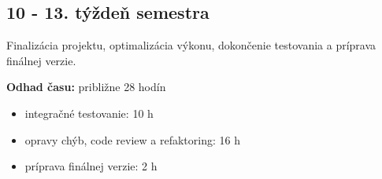 \subsection*{10 - 13. týždeň semestra}
Finalizácia projektu, optimalizácia výkonu, dokončenie testovania a príprava finálnej verzie.

\hspace{-1.5em}\textbf{Odhad času:} približne 28 hodín
\begin{itemize}[itemsep=2pt]
    \item integračné testovanie: 10 h
    \item opravy chýb, code review a refaktoring: 16 h
    \item príprava finálnej verzie: 2 h
\end{itemize}